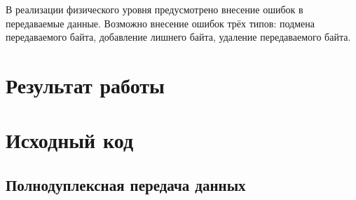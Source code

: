 \documentclass[a4paper,10pt]{article}
\begin{document}
В реализации физического уровня предусмотрено внесение ошибок в передаваемые данные.
Возможно внесение ошибок трёх типов: подмена передаваемого байта, 
добавление лишнего байта, удаление передаваемого байта.

\section{Результат работы}

\pagebreak

\appendix
\section{Исходный код}
\label{appendix-sources}
\subsection{Полнодуплексная передача данных}
\label{appendix-sources-duplex-link}


\pagebreak



\end{document}
